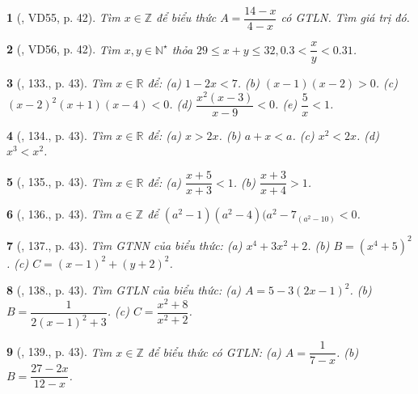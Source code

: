 \documentclass{article}
\newtheorem{baitoan}{}
\begin{document}
\begin{baitoan}[\cite{Binh_Toan_7_tap_1}, VD55, p. 42]
	Tìm $x\in\mathbb{Z}$ để biểu thức $A = \dfrac{14 - x}{4 - x}$ có {\rm GTLN}. Tìm giá trị đó.
\end{baitoan}

\begin{baitoan}[\cite{Binh_Toan_7_tap_1}, VD56, p. 42]
	Tìm $x,y\in\mathbb{N}^\star$ thỏa $29\le x + y\le32,0.3 < \dfrac{x}{y} < 0.31$.
\end{baitoan}

\begin{baitoan}[\cite{Binh_Toan_7_tap_1}, 133., p. 43]
	Tìm $x\in\mathbb{R}$ để: (a) $1 - 2x < 7$. (b) $(x - 1)(x - 2) > 0$. (c) $(x - 2)^2(x + 1)(x - 4) < 0$. (d) $\dfrac{x^2(x - 3)}{x - 9} < 0$. (e) $\dfrac{5}{x} < 1$.
\end{baitoan}

\begin{baitoan}[\cite{Binh_Toan_7_tap_1}, 134., p. 43]
	Tìm $x\in\mathbb{R}$ để: (a) $x > 2x$. (b) $a + x < a$. (c) $x^2 < 2x$. (d) $x^3 < x^2$.
\end{baitoan}

\begin{baitoan}[\cite{Binh_Toan_7_tap_1}, 135., p. 43]
	Tìm $x\in\mathbb{R}$ để: (a) $\dfrac{x + 5}{x + 3} < 1$. (b) $\dfrac{x + 3}{x + 4} > 1$.
\end{baitoan}

\begin{baitoan}[\cite{Binh_Toan_7_tap_1}, 136., p. 43]
	Tìm $a\in\mathbb{Z}$ để $(a^2 - 1)(a^2 - 4)(a^2 - 7_(a^2 - 10) < 0$.
\end{baitoan}

\begin{baitoan}[\cite{Binh_Toan_7_tap_1}, 137., p. 43]
	 Tìm {\rm GTNN} của biểu thức: (a) $x^4 + 3x^2 + 2$. (b) $B = (x^4 + 5)^2$. (c) $C = (x - 1)^2 + (y + 2)^2$.
\end{baitoan}

\begin{baitoan}[\cite{Binh_Toan_7_tap_1}, 138., p. 43]
	Tìm {\rm GTLN} của biểu thức: (a) $A = 5 - 3(2x - 1)^2$. (b) $B = \dfrac{1}{2(x - 1)^2 + 3}$. (c) $C = \dfrac{x^2 + 8}{x^2 + 2}$.
\end{baitoan}

\begin{baitoan}[\cite{Binh_Toan_7_tap_1}, 139., p. 43]
	Tìm $x\in\mathbb{Z}$ để biểu thức có {\rm GTLN}: (a) $A = \dfrac{1}{7 - x}$. (b) $B = \dfrac{27 - 2x}{12 - x}$.
\end{baitoan}
\end{document}
